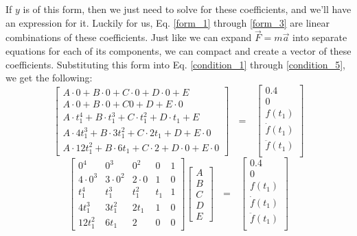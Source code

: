 \documentclass[nofoot,pdf-a,balance,colorlinks,upint,subscriptcorrection,varvw,mathalfa=cal=boondoxo]{asmeconf}
\begin{document}
    If $y$ is of this form, then we just need to solve for these coefficients, and we'll have an expression for it. Luckily for us, Eq. \eqref{form_1} through \eqref{form_3} are linear combinations of these coefficients. Just like we can expand $\vec{F} = m \vec{a}$ into separate equations for each of its components, we can compact and create a vector of these coefficients. Substituting this form into Eq. \eqref{condition_1} through \eqref{condition_5}, we get the following:
    \begin{equation}
        \begin{bmatrix}
            A \cdot 0 + B\cdot 0 + C\cdot 0 + D\cdot 0 + E \\
            A \cdot 0 + B\cdot 0 + C  0 + D + E \cdot 0 \\
            A \cdot  t_1^4 + B\cdot  t_1^3 + C\cdot  t_1^2 + D\cdot  t_1 + E \\
            A \cdot  4t_1^3 + B\cdot  3t_1^2 + C \cdot  2t_1 + D + E \cdot  0 \\
            A\cdot 12t_1^2 + B\cdot  6t_1 + C \cdot  2 + D\cdot 0 + E\cdot  0
        \end{bmatrix} \textrm{ } = \textrm{ }  
        \begin{bmatrix}
            0.4 \\ 
            0 \\
            f\left(t_1\right) \\
            \dot{f}\left(t_1\right) \\
            \ddot{f}\left(t_1\right) \\
        \end{bmatrix}
    \end{equation}
    \begin{equation}
        \begin{bmatrix}
            0^4 & 0^3 & 0^2 & 0 & 1 \\
            4\cdot 0^3 & 3\cdot 0^2 & 2\cdot 0 & 1 & 0 \\
            t_1^4 & t_1^3 & t_1^2 & t_1 & 1 \\
            4t_1^3 & 3t_1^2 & 2t_1 & 1 & 0 \\
            12t_1^2 & 6t_1 & 2 & 0 & 0
        \end{bmatrix}
        \begin{bmatrix}
            A \\
            B \\ 
            C \\ 
            D \\ 
            E 
        \end{bmatrix}
        \textrm{ } = \textrm{ }  
        \begin{bmatrix}
            0.4 \\ 
            0 \\
            f\left(t_1\right) \\
            \dot{f}\left(t_1\right) \\
            \ddot{f}\left(t_1\right) \\
        \end{bmatrix}
    \end{equation}
\end{document}
